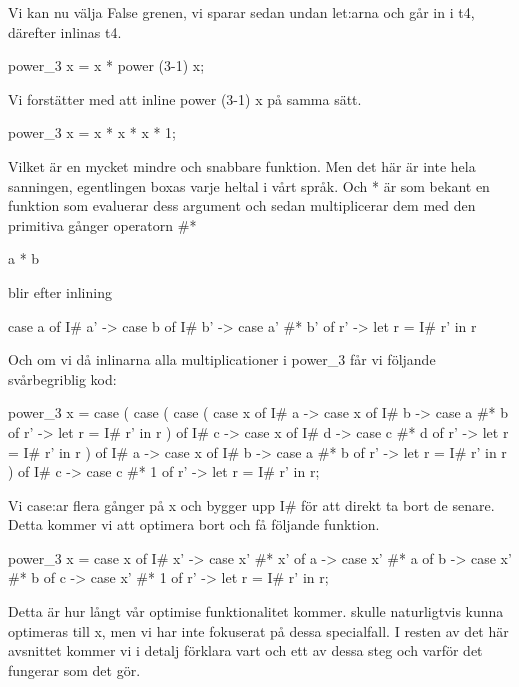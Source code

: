 \documentclass[../Optimise]{subfiles}
\begin{document}
Vi kan nu välja False grenen, vi sparar sedan undan let:arna och går in i t4, därefter inlinas t4.

\begin{codeEx}
power_3 x = x * power (3-1) x;
\end{codeEx}

Vi forstätter med att inline power (3-1) x på samma sätt.

\begin{codeEx}
power_3 x = x * x * x * 1;
\end{codeEx}

Vilket är en mycket mindre och snabbare funktion.
Men det här är inte hela sanningen, egentlingen boxas varje heltal i vårt språk.
 Och * är som bekant en funktion som evaluerar dess argument och sedan multiplicerar
dem med den primitiva gånger operatorn \#*

\begin{codeEx}
a * b
\end{codeEx}

blir efter inlining

\begin{codeEx}
case a of
    { I# a' -> case b of
        { I# b' -> case  a' #* b' of
            { r' -> let r = I# r' in r}}}
\end{codeEx}

Och om vi då inlinarna alla multiplicationer i power\_3 får vi följande svårbegriblig kod:
\begin{codeEx}
power_3 x = case 
    ( case 
        ( case 
            ( case x of
                { I# a -> case x of
                    { I# b -> case a #* b of
                        { r' -> let r = I# r' in r}}}
            ) of
            { I# c -> case x of
                { I# d -> case c #* d of
                    { r' -> let r = I# r' in r}}}                
         ) of
         { I# a -> case x of
              { I# b -> case a #* b of
                   { r' -> let r = I# r' in r}}}
    ) of
        { I# c -> case c #* 1 of
            { r' -> let r = I# r' in r}};                                     
\end{codeEx}


Vi case:ar flera gånger på x och bygger upp I\# för att direkt ta bort de senare.
 Detta kommer vi att optimera bort och få följande funktion.

\begin{codeEx}
power_3 x = case x of
    { I# x' -> case x' #* x' of
        { a -> case x' #* a of
            { b -> case x' #* b of
                { c -> case x' #* 1 of
                    { r' -> let r = I# r' in r}}}}};
\end{codeEx}

Detta är hur långt vår optimise funktionalitet kommer.  skulle naturligtvis
kunna optimeras till x, men vi har inte fokuserat på dessa specialfall.
I resten av det här avsnittet kommer vi i detalj förklara vart och ett av dessa 
steg och varför det fungerar som det gör.
\end{document}
